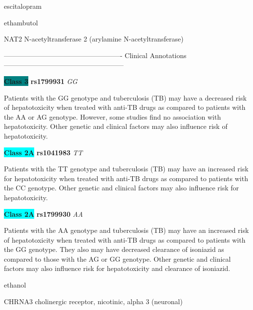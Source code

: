 \documentclass{resume} %
\begin{document}
\begin{rSection}{ escitalopram }
\end{rSection}\begin{rSection}{ ethambutol }
\item[]

\begin{rSubsection}{ NAT2 }{ N-acetyltransferase 2 (arylamine N-acetyltransferase) }{}{}
\item[]

\item[] ---------------------------------------------------- Clinical Annotations -----------------------------------------------------\newline
\item \textbf{\colorbox{teal} {Class 3}} \textbf{ rs1799931 } \textit{ GG }
\item[] Patients with the GG genotype and tuberculosis (TB) may have a decreased risk of hepatotoxicity when treated with anti-TB drugs as compared to patients with the AA or AG genotype. However, some studies find no association with hepatotoxicity. Other genetic and clinical factors may also influence risk of hepatotoxicity.\item \textbf{\colorbox{cyan} {Class 2A}} \textbf{ rs1041983 } \textit{ TT }
\item[] Patients with the TT genotype and tuberculosis (TB) may have an increased risk for hepatotoxicity when treated with anti-TB drugs as compared to patients with the CC genotype. Other genetic and clinical factors may also influence risk for hepatotoxicity.\item \textbf{\colorbox{cyan} {Class 2A}} \textbf{ rs1799930 } \textit{ AA }
\item[] Patients with the AA genotype and tuberculosis (TB) may have an increased risk of hepatotoxicity when treated with anti-TB drugs as compared to patients with the GG genotype. They also may have decreased clearance of isoniazid as compared to those with the AG or GG genotype. Other genetic and clinical factors may also influence risk for hepatotoxicity and clearance of isoniazid.
\end{rSubsection}

\end{rSection}\begin{rSection}{ ethanol }
\item[]

\begin{rSubsection}{ CHRNA3 }{ cholinergic receptor, nicotinic, alpha 3 (neuronal) }{}{}
\item[]


\end{rSubsection}
\end{rSection}
\end{document}

